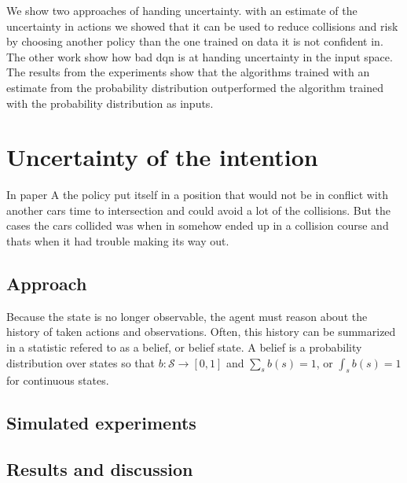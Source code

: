 	


We show two approaches of handing uncertainty. with an estimate of the uncertainty in actions we showed that it can be used to reduce collisions and risk by choosing another policy than the one trained on data it is not confident in. 
The other work show how bad \gls{dqn} is at handing uncertainty in the input space. The results from the experiments show that the algorithms trained with an estimate from the probability distribution outperformed the algorithm trained with the probability distribution as inputs. 

\section{Uncertainty of the intention}
In paper A the policy put itself in a position that would not be in conflict with another cars time to intersection and could avoid a lot of the collisions. But the cases the cars collided was when in somehow ended up in a collision course and thats when it had trouble making its way out. 

\subsection{Approach}


Because the state is no longer observable, the agent must reason about the history of taken actions and observations. Often, this history can be summarized in a statistic refered to as a belief, or belief state. A belief is a probability distribution over states so that $b: \mathcal{S} \rightarrow [0,1]$ and $\sum_{s} b(s)=1$, or $\int_{s} b(s)=1$ for continuous states. 

\subsection{Simulated experiments}

\subsection{Results and discussion}
